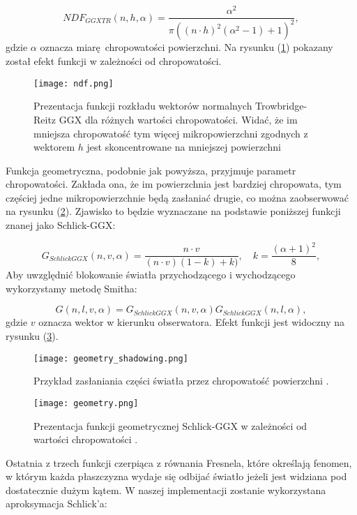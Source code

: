$$
NDF_{GGXTR}(n,h,\alpha) = \frac{\alpha^2}{\pi\left( (n\cdot h)^2 (\alpha^2 - 1) + 1 \right)^2 },
$$
gdzie $\alpha$ oznacza miarę chropowatości powierzchni. Na rysunku (\ref{normaldistribution}) pokazany został efekt funkcji w zależności od chropowatości.


\begin{figure}[h]
	\centering
	\texttt{[image: ndf.png]}
	\caption{Prezentacja funkcji rozkładu wektorów normalnych Trowbridge-Reitz GGX dla różnych wartości chropowatości. Widać, że im mniejsza chropowatość tym więcej mikropowierzchni zgodnych z wektorem $h$ jest skoncentrowane na mniejszej powierzchni}
	\label{normaldistribution}
\end{figure}

Funkcja geometryczna, podobnie jak powyższa, przyjmuje parametr chropowatości. Zakłada ona, że im powierzchnia jest bardziej chropowata, tym częściej jedne mikropowierzchnie będą zasłaniać drugie, co można zaobserwować na rysunku (\ref{geometry_shadowing}). Zjawisko to będzie wyznaczane na podstawie poniższej funkcji znanej jako Schlick-GGX:

$$
G_{SchlickGGX}(n,v,\alpha) = \frac{n \cdot v}{(n\cdot v)(1-k) + k)}, \hspace{1em} k = \frac{(\alpha+1)^2}{8},
$$
Aby uwzględnić blokowanie światła przychodzącego i wychodzącego wykorzystamy metodę Smitha:

$$
G(n, l, v, \alpha)  = G_{SchlickGGX}(n,v,\alpha)G_{SchlickGGX}(n,l,\alpha),
$$
gdzie $v$ oznacza wektor w kierunku obserwatora. Efekt funkcji jest widoczny na rysunku (\ref{geometry}).

\begin{figure}[h]
	\centering
	\texttt{[image: geometry\_shadowing.png]}
	\caption{Przykład zasłaniania części światła przez chropowatość powierzchni \cite{learnopengl}.}
	\label{geometry_shadowing}
\end{figure}


\begin{figure}[h]
	\centering
	\texttt{[image: geometry.png]}
	\caption{Prezentacja funkcji geometrycznej Schlick-GGX w zależności od wartości chropowatości \cite{learnopengl}.}
	\label{geometry}
\end{figure}

Ostatnia z trzech funkcji czerpiąca z równania Fresnela, które określają fenomen, w którym każda płaszczyzna wydaje się odbijać światło jeżeli jest widziana pod dostatecznie dużym kątem. W naszej implementacji zostanie wykorzystana aproksymacja Schlick'a:

